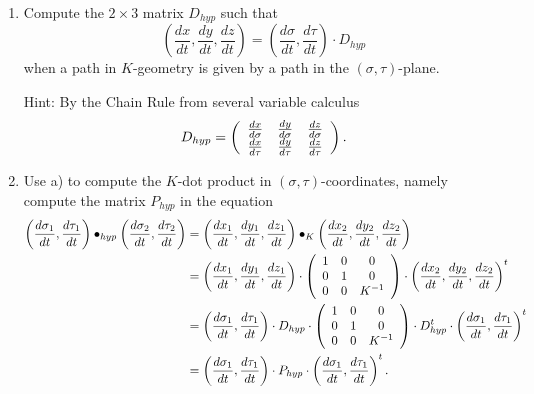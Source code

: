 \documentclass{ximera}
\begin{document}
\begin{exercise}\hfil
\begin{enumerate}
\item Compute the $2\times3$ matrix $D_{hyp}$ such that%
\[
\left(  \frac{dx}{dt},\frac{dy}{dt},\frac{dz}{dt}\right)  =\left(
\frac{d\sigma}{dt},\frac{d\tau}{dt}\right)  \cdot D_{hyp}%
\]
when a path in $K$-geometry is given by a path in the $\left(\sigma,\tau\right)  $-plane.

Hint: By the Chain Rule from several variable calculus%
\[
D_{hyp}=\left(
\begin{array}
[c]{ccc}%
\frac{dx}{d\sigma} & \frac{dy}{d\sigma} & \frac{dz}{d\sigma}\\
\frac{dx}{d\tau} & \frac{dy}{d\tau} & \frac{dz}{d\tau}%
\end{array}
\right)  .
\]
\item Use a) to compute the $K$-dot product in $\left(  \sigma,\tau\right)
$-coordinates, namely compute the matrix $P_{hyp}$ in the equation%
\begin{align*}
\left(  \frac{d\sigma_{1}}{dt},\frac{d\tau_{1}}{dt}\right)  \bullet
_{hyp}\left(  \frac{d\sigma_{2}}{dt},\frac{d\tau_{2}}{dt}\right)   &  =\left(
\frac{dx_{1}}{dt},\frac{dy_{1}}{dt},\frac{dz_{1}}{dt}\right)  \bullet
_{K}\left(  \frac{dx_{2}}{dt},\frac{dy_{2}}{dt},\frac{dz_{2}}{dt}\right) \\
&  =\left(  \frac{dx_{1}}{dt},\frac{dy_{1}}{dt},\frac{dz_{1}}{dt}\right)
\cdot\left(
\begin{array}
[c]{ccc}%
1 & 0 & 0\\
0 & 1 & 0\\
0 & 0 & K^{-1}%
\end{array}
\right)  \cdot\left(  \frac{dx_{2}}{dt},\frac{dy_{2}}{dt},\frac{dz_{2}}%
{dt}\right)  ^{t}\\
&  =\left(  \frac{d\sigma_{1}}{dt},\frac{d\tau_{1}}{dt}\right)  \cdot
D_{hyp}\cdot\left(
\begin{array}
[c]{ccc}%
1 & 0 & 0\\
0 & 1 & 0\\
0 & 0 & K^{-1}%
\end{array}
\right)  \cdot D_{hyp}^{t}\cdot\left(  \frac{d\sigma_{1}}{dt},\frac{d\tau_{1}%
}{dt}\right)  ^{t}\\
&  =\left(  \frac{d\sigma_{1}}{dt},\frac{d\tau_{1}}{dt}\right)  \cdot
P_{hyp}\cdot\left(  \frac{d\sigma_{1}}{dt},\frac{d\tau_{1}}{dt}\right)  ^{t}.
\end{align*}
\end{enumerate}
\end{exercise}
\end{document}
